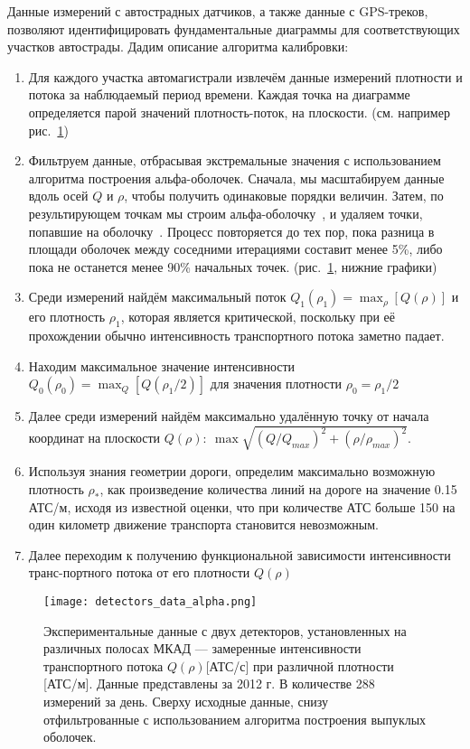 Данные измерений с автострадных датчиков, а также данные с GPS-треков, позволяют идентифицировать фундаментальные диаграммы для соответствующих участков автострады. Дадим описание алгоритма калибровки:
\begin{enumerate}
  \item Для каждого участка автомагистрали извлечём данные измерений плотности и потока за наблюдаемый период времени. 
        Каждая точка на диаграмме определяется парой значений плотность-поток, на плоскости. (см. например рис.~\ref{fig:detectors_data_alpha})
  \item Фильтруем данные, отбрасывая экстремальные значения с использованием алгоритма построения альфа-оболочек. 
        Сначала, мы масштабируем данные вдоль осей \(Q\) и \(\rho\), чтобы получить одинаковые порядки величин. 
        Затем, по результирующем точкам мы строим альфа-оболочку~\cite{edelsbrunner1983shape}, и удаляем точки, попавшие на оболочку~\cite{eddy19825th}. 
        Процесс повторяется до тех пор, пока разница в площади оболочек между соседними итерациями составит менее 5\%, либо пока не останется менее 90\% начальных точек. (рис.~\ref{fig:detectors_data_alpha}, нижние графики)
  \item Среди измерений найдём максимальный поток \(Q_1(\rho_1) = \max_{\rho}[Q(\rho)]\) и его плотность \(\rho_1\), которая является критической, поскольку при её прохождении обычно интенсивность транспортного потока заметно падает.
  \item Находим максимальное значение интенсивности \(Q_0(\rho_0) = \max_{Q}[Q(\rho_1 / 2)]\) для значения плотности \(\rho_0 = \rho_1 / 2\)
  \item Далее среди измерений найдём максимально удалённую точку от начала координат на плоскости  \(Q(\rho):\ \max \sqrt{(Q/Q_{max})^2 + (\rho/\rho_{max})^2}\).
  \item Используя знания геометрии дороги, определим максимально возможную плотность \(\rho_*\), как произведение количества линий на дороге на значение 0.15 АТС/м, исходя из известной оценки, что при количестве АТС больше 150 на один километр движение транспорта становится невозможным.
  \item Далее переходим к получению функциональной зависимости интенсивности транс-портного потока от его плотности \(Q(\rho)\)
\end{enumerate}
\begin{figure}[ht]
\begin{center}
\texttt{[image: detectors\_data\_alpha.png]}
\caption{Экспериментальные данные с двух детекторов, установленных на различных полосах МКАД --- замеренные интенсивности транспортного потока \(Q(\rho)\)[АТС/с] при различной плотности [АТС/м]. Данные представлены за 2012 г. В количестве 288 измерений за день. Сверху исходные данные, снизу отфильтрованные с использованием алгоритма построения выпуклых оболочек.}
\label{fig:detectors_data_alpha}
\end{center}
\end{figure}

